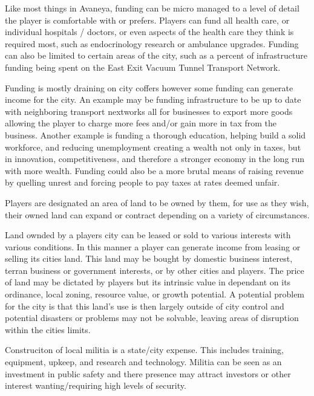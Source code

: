 Like most things in Avaneya, funding can be micro managed to a level of detail the player is comfortable with or prefers. Players can fund all health care, or individual hospitals / doctors, or even aspects of the health care they think is required most, such as endocrinology research or ambulance upgrades. Funding can also be limited to certain areas of the city, such as a percent of infrastructure funding being spent on the East Exit Vacuum Tunnel Transport Network.

Funding is mostly draining on city coffers however some funding can generate income for the city. An example may be funding infrastructure to be up to date with neighboring transport nextworks all for businesses to export more goods allowing the player to charge more fees and/or gain more in tax from the business. Another example is funding a thorough education, helping build a solid workforce, and reducing unemployment creating a wealth not only in taxes, but in innovation, competitiveness, and therefore a stronger economy in the long run with more wealth. Funding could also be a more brutal means of raising revenue by quelling unrest and forcing people to pay taxes at rates deemed unfair.


Players are designated an area of land to be owned by them, for use as they wish, their owned land can expand or contract depending on a variety of circumstances. 

Land ownded by a players city can be leased or sold to various interests with various conditions. In this manner a player can generate income from leasing or selling its cities land. This land may be bought by domestic business interest, terran business or government interests, or by other cities and players. The price of land may be dictated by players but its intrinsic value in dependant on its ordinance, local zoning, resource value, or growth potential. %
A potential problem for the city is that this land's use is then largely outside of city control and potential disasters or problems may not be solvable, leaving areas of disruption within the cities limits.



Construciton of local militia is a state/city expense. This includes training, equipment, upkeep, and research and technology. Militia can be seen as an investment in public safety and there presence may attract investors or other interest wanting/requiring high levels of security.





